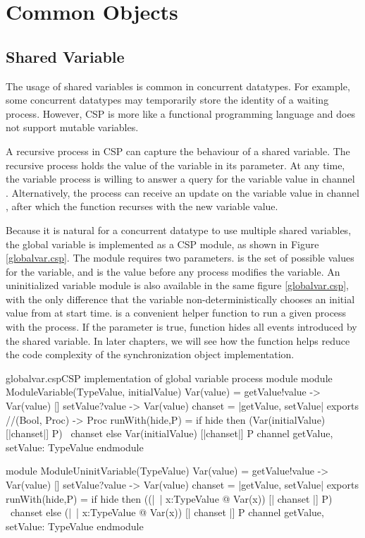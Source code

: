 \documentclass{article}
\begin{document}
\section{Common Objects}
\subsection{Shared Variable}
The usage of shared variables is common in concurrent datatypes. For example, some concurrent datatypes may temporarily store the identity of a waiting process. However, CSP is more like a functional programming language and does not support mutable variables. 

A recursive process in CSP can capture the behaviour of a shared variable. The recursive process holds the value of the variable in its parameter. At any time, the variable process is willing to answer a query for the variable value in channel . Alternatively, the process can receive an update on the variable value in channel , after which the function recurses with the new variable value.

Because it is natural for a concurrent datatype to use multiple shared variables, the global variable is implemented as a CSP module, as shown in Figure \ref{globalvar.csp}. The module requires two parameters.  is the set of possible values for the variable, and  is the value before any process modifies the variable. An uninitialized variable module is also available in the same figure \ref{globalvar.csp}, with the only difference that the variable non-deterministically chooses an initial value from  at start time.  is a convenient helper function to run a given process  with the  process. If the parameter  is true,  function hides all events introduced by the shared variable. In later chapters, we will see how the  function helps reduce the code complexity of the synchronization object implementation.

\begin{cspinline}{globalvar.csp}{CSP implementation of global variable process module}
module ModuleVariable(TypeValue, initialValue)
  Var(value) = getValue!value -> Var(value)
             [] setValue?value -> Var(value)
  chanset = {|getValue, setValue|}
exports
  //(Bool, Proc) -> Proc
  runWith(hide,P) = if hide then (Var(initialValue) [|chanset|] P) \ chanset
                            else  Var(initialValue) [|chanset|] P
  channel getValue, setValue: TypeValue
endmodule

module ModuleUninitVariable(TypeValue)
  Var(value) = getValue!value -> Var(value)
            [] setValue?value -> Var(value)
  chanset = {|getValue, setValue|}
exports
  runWith(hide,P) = 
    if hide then ((|~| x:TypeValue @ Var(x)) [| chanset |] P) \ chanset
    else (|~| x:TypeValue @ Var(x)) [| chanset |] P
  channel getValue, setValue: TypeValue
endmodule
\end{cspinline}
\end{document}
